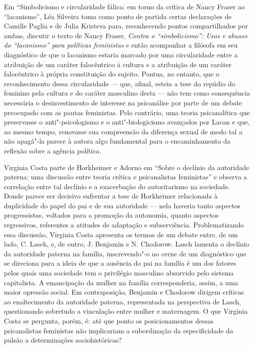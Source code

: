 Em ``Simbolicismo e circularidade fálica: em torno da crítica de Nancy
Fraser ao ``lacanismo'', Léa Silveira toma como ponto de partida certas
declarações de Camille Paglia e de Julia Kristeva para, reconhecendo
pontos compartilhados por ambas, discutir o texto de Nancy Fraser,
\emph{Contra o ``simbolicismo'': Usos e abusos do ``lacanismo'' para
políticas feministas} e então acompanhar a filósofa em seu diagnóstico
de que o lacanismo estaria marcado por uma circularidade entre a
atribuição de um caráter falocêntrico à cultura e a atribuição de um
caráter falocêntrico à própria constituição do sujeito. Pontua, no
entanto, que o reconhecimento dessa circularidade --- que, afinal, esteia
a tese do repúdio do feminino pela cultura e do caráter masculino desta
--- não tem como consequência necessária o desinvestimento de interesse
na psicanálise por parte de um debate preocupado com as pautas
feministas. Pelo contrário, uma teoria psicanalítica que preservasse o
anti"-psicologismo e o anti"-biologicismo avançados por Lacan e que, ao
mesmo tempo, renovasse sua compreensão da diferença sexual de modo tal a
não apagá"-la parece à autora algo fundamental para o encaminhamento da
reflexão sobre a agência política.

Virginia Costa parte de Horkheimer e Adorno em ``Sobre o declínio da
autoridade paterna: uma discussão entre teoria crítica e psicanalistas
feministas'' e observa a correlação entre tal declínio e a exacerbação
do autoritarismo na sociedade. Donde parece ser decisivo enfrentar a
tese de Horkheimer relacionada à duplicidade do papel do pai e de sua
autoridade --- nela haveria tanto aspectos progressistas, voltados para a
promoção da autonomia, quanto aspectos regressivos, referentes a
atitudes de adaptação e subserviência. Problematizando essa discussão,
Virginia Costa apresenta os termos de um debate entre, de um lado, C.
Lasch, e, de outro, J. Benjamin e N. Chodorow. Lasch lamenta o declínio
da autoridade paterna na família, inscrevendo"-o no cerne de um
diagnóstico que se direciona para a ideia de que a ausência do pai na
família é um dos fatores pelos quais uma sociedade tem o privilégio
masculino absorvido pelo sistema capitalista. A emancipação da mulher na
família corresponderia, assim, a uma maior opressão social. Em
contraposição, Benjamin e Chodorow dirigem críticas ao enaltecimento da
autoridade paterna, representada na perspectiva de Lasch, questionando
sobretudo a vinculação entre mulher e maternagem. O que Virginia Costa
se pergunta, porém, é: até que ponto os posicionamentos dessas
psicanalistas feministas não implicariam a subordinação da
especificidade da pulsão a determinações sociohistóricas?

